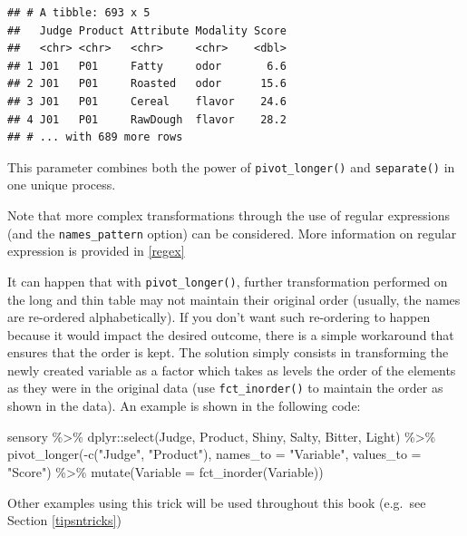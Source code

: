 \documentclass[
]{krantz}
\makeatletter
\newenvironment{Shaded}{\begin{snugshade}}{\end{snugshade}}
\newcommand{\AttributeTok}[1]{\textcolor[rgb]{0.61,0.61,0.61}{#1}}
\newcommand{\FunctionTok}[1]{\textcolor[rgb]{0,0,0}{#1}}
\newcommand{\NormalTok}[1]{#1}
\newcommand{\SpecialCharTok}[1]{\textcolor[rgb]{0,0,0}{#1}}
\newcommand{\StringTok}[1]{\textcolor[rgb]{0.5,0.5,0.5}{#1}}
\renewenvironment{quote}{\begin{VF}}{\end{VF}}
\newenvironment{kframe}{%
\medskip{}
\setlength{\fboxsep}{.8em}
 \def\at@end@of@kframe{}%
 \ifinner\ifhmode%
  \def\at@end@of@kframe{\end{minipage}}%
  \begin{minipage}{\columnwidth}%
 \fi\fi%
 \def\FrameCommand##1{\hskip\@totalleftmargin \hskip-\fboxsep
 \colorbox{shadecolor}{##1}\hskip-\fboxsep
     \hskip-\linewidth \hskip-\@totalleftmargin \hskip\columnwidth}%
 \MakeFramed {\advance\hsize-\width
   \@totalleftmargin\z@ \linewidth\hsize
   \@setminipage}}%
 {\par\unskip\endMakeFramed%
 \at@end@of@kframe}
\renewenvironment{Shaded}{\begin{kframe}}{\end{kframe}}
\makeatother
\begin{document}
\begin{verbatim}
## # A tibble: 693 x 5
##   Judge Product Attribute Modality Score
##   <chr> <chr>   <chr>     <chr>    <dbl>
## 1 J01   P01     Fatty     odor       6.6
## 2 J01   P01     Roasted   odor      15.6
## 3 J01   P01     Cereal    flavor    24.6
## 4 J01   P01     RawDough  flavor    28.2
## # ... with 689 more rows
\end{verbatim}

This parameter combines both the power of \texttt{pivot\_longer()} and \texttt{separate()} in one unique process.

Note that more complex transformations through the use of regular expressions (and the \texttt{names\_pattern} option) can be considered. More information on regular expression is provided in \ref{regex}

\begin{quote}
It can happen that with \texttt{pivot\_longer()}, further transformation performed on the long and thin table may not maintain their original order (usually, the names are re-ordered alphabetically). If you don't want such re-ordering to happen because it would impact the desired outcome, there is a simple workaround that ensures that the order is kept. The solution simply consists in transforming the newly created variable as a factor which takes as levels the order of the elements as they were in the original data (use \texttt{fct\_inorder()} to maintain the order as shown in the data). An example is shown in the following code:
\end{quote}

\begin{Shaded}
\begin{Highlighting}[]
\NormalTok{sensory }\SpecialCharTok{\%\textgreater{}\%}
\NormalTok{  dplyr}\SpecialCharTok{::}\FunctionTok{select}\NormalTok{(Judge, Product, Shiny, Salty, Bitter, Light) }\SpecialCharTok{\%\textgreater{}\%}
  \FunctionTok{pivot\_longer}\NormalTok{(}\SpecialCharTok{{-}}\FunctionTok{c}\NormalTok{(}\StringTok{"Judge"}\NormalTok{, }\StringTok{"Product"}\NormalTok{), }
               \AttributeTok{names\_to =} \StringTok{"Variable"}\NormalTok{, }\AttributeTok{values\_to =} \StringTok{"Score"}\NormalTok{) }\SpecialCharTok{\%\textgreater{}\%}
  \FunctionTok{mutate}\NormalTok{(}\AttributeTok{Variable =} \FunctionTok{fct\_inorder}\NormalTok{(Variable))}
\end{Highlighting}
\end{Shaded}

Other examples using this trick will be used throughout this book (e.g.~see Section \ref{tipsntricks})
\end{document}
